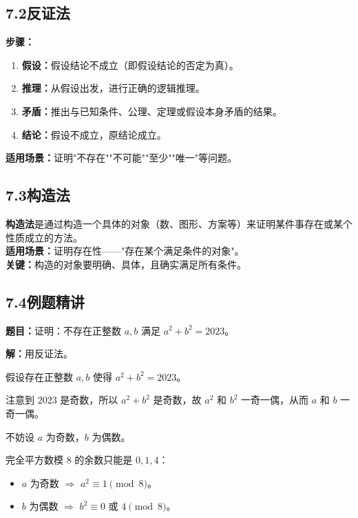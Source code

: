 \documentclass[12pt, a4paper]{ctexart}
\begin{document}
\subsection*{7.2\quad 反证法}

\begin{knowledgebox}[反证法]
\textbf{步骤：}
\begin{enumerate}[itemsep=2pt]
  \item \textbf{假设：}假设结论不成立（即假设结论的否定为真）。
  \item \textbf{推理：}从假设出发，进行正确的逻辑推理。
  \item \textbf{矛盾：}推出与已知条件、公理、定理或假设本身矛盾的结果。
  \item \textbf{结论：}假设不成立，原结论成立。
\end{enumerate}
\textbf{适用场景：}证明"不存在""不可能""至少""唯一"等问题。
\end{knowledgebox}

\subsection*{7.3\quad 构造法}

\begin{knowledgebox}[构造法]
\textbf{构造法}是通过构造一个具体的对象（数、图形、方案等）来证明某件事存在或某个性质成立的方法。\\[4pt]
\textbf{适用场景：}证明存在性——"存在某个满足条件的对象"。\\[4pt]
\textbf{关键：}构造的对象要明确、具体，且确实满足所有条件。
\end{knowledgebox}

\subsection*{7.4\quad 例题精讲}

\begin{examplebox}[【例18】反证法证明]
\textbf{题目：}证明：不存在正整数 $a,b$ 满足 $a^2+b^2=2023$。
\end{examplebox}

\textbf{解：}\;用反证法。

假设存在正整数 $a,b$ 使得 $a^2+b^2=2023$。

注意到 $2023$ 是奇数，所以 $a^2+b^2$ 是奇数，故 $a^2$ 和 $b^2$ 一奇一偶，从而 $a$ 和 $b$ 一奇一偶。

不妨设 $a$ 为奇数，$b$ 为偶数。

完全平方数模 $8$ 的余数只能是 $0,1,4$：
\begin{itemize}[itemsep=1pt]
  \item $a$ 为奇数 $\Rightarrow$ $a^2\equiv 1\pmod{8}$。
  \item $b$ 为偶数 $\Rightarrow$ $b^2\equiv 0$ 或 $4\pmod{8}$。
\end{itemize}
\end{document}
